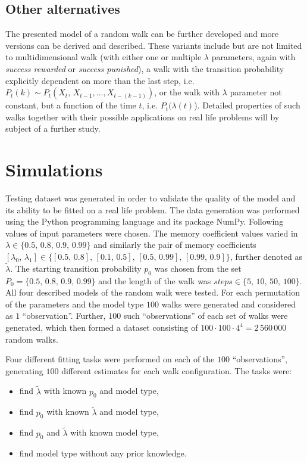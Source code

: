 \documentclass{amsart}
\theoremstyle{definition}
\theoremstyle{plain}
\theoremstyle{plain}
\theoremstyle{plain}
\numberwithin{equation}{section}
\begin{document}
\subsection{Other alternatives}

The presented model of a random walk can be further developed and
more versions can be derived and described. These variants include
but are not limited to multidimensional walk (with either one or multiple
$\lambda$ parameters, again with \emph{success rewarded }or \emph{success
punished}), a walk with the transition probability explicitly dependent
on more than the last step, i.e. $P_{t}(k)\sim P_{t}(X_{t},\,X_{t-1},\dots,X_{t-(k-1)})$,
or the walk with $\lambda$ parameter not constant, but a function
of the time $t$, i.e. $P_{t}(\lambda(t)$). Detailed properties of
such walks together with their possible applications on real life
problems will by subject of a further study.

\section{Simulations\label{sec:Simulations}}

Testing dataset was generated in order to validate the quality of
the model and its ability to be fitted on a real life problem. The
data generation was performed using the Python programming language
and its package NumPy. Following values of input parameters were chosen.
The memory coefficient values varied in $\lambda\in\{0.5,\,0.8,\,0.9,\,0.99\}$
and similarly the pair of memory coefficients $[\lambda_{0},\,\lambda_{1}]\in\{[0.5,\,0.8],\,[0.1,\,0.5],\,[0.5,\,0.99],\,[0.99,\,0.9]\}$, further denoted as $\tilde{\lambda}$.
The starting transition probability $p_{0}$ was chosen from the set
$P_{0}=\{0.5,\,0.8,\,0.9,\,0.99\}$ and the length of the walk was
\textbf{$steps\in\{5,\,10,\,50,\,100\}$}. All four described models of the random walk were tested. For each permutation of the
parameters and the model type $100$ walks were generated and considered as $1$ ``observation''. Further, $100$ such ``observations'' of each set of walks were generated, which then formed a dataset consisting of $100\cdot100\cdot4^4=2\,560\,000$ random walks. 

Four different fitting tasks were performed on each of the $100$ ``observations'', generating $100$ different estimates for each walk configuration. The tasks were:

\begin{itemize}
\item find $\tilde{\lambda}$ with known $p_{0}$ and model type,
\item find $p_{0}$ with known $\tilde{\lambda}$ and model type,
\item find $p_{0}$ and $\tilde{\lambda}$ with known model type,
\item find model type without any prior knowledge.
\end{itemize}
\end{document}
